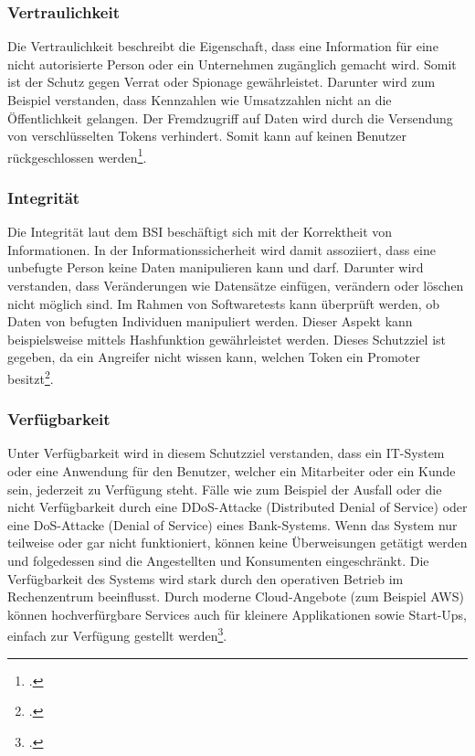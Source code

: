 \subsubsection{Vertraulichkeit}
Die Vertraulichkeit beschreibt die Eigenschaft, dass eine Information für eine nicht autorisierte Person oder ein Unternehmen zugänglich gemacht wird. Somit ist der Schutz gegen Verrat oder Spionage gewährleistet. Darunter wird zum Beispiel verstanden, dass Kennzahlen wie Umsatzzahlen nicht an die Öffentlichkeit gelangen. 
Der Fremdzugriff auf Daten wird durch die Versendung von verschlüsselten Tokens verhindert. Somit kann auf keinen Benutzer rückgeschlossen werden\footcite{Lehrunterlagen-HTL-cloud}.


\subsubsection{Integrität}
Die Integrität laut dem BSI beschäftigt sich mit der Korrektheit von Informationen. In der Informationssicherheit wird damit assoziiert, dass eine unbefugte Person keine Daten manipulieren kann und darf. Darunter wird verstanden, dass Veränderungen wie Datensätze einfügen, verändern oder löschen nicht möglich sind.
Im Rahmen von Softwaretests kann überprüft werden, ob Daten von befugten Individuen manipuliert werden. Dieser Aspekt kann beispielsweise mittels Hashfunktion gewährleistet werden.
Dieses Schutzziel ist gegeben, da ein Angreifer nicht wissen kann, welchen Token ein Promoter besitzt\footcite{Lehrunterlagen-HTL-cloud}.

\subsubsection{Verfügbarkeit}
Unter Verfügbarkeit wird in diesem Schutzziel verstanden, dass ein IT-System oder eine Anwendung für den Benutzer, welcher ein Mitarbeiter oder ein Kunde sein, jederzeit zu Verfügung steht. Fälle wie zum Beispiel der Ausfall oder die nicht Verfügbarkeit durch eine DDoS-Attacke (Distributed Denial of Service) oder eine DoS-Attacke (Denial of Service) eines Bank-Systems. Wenn das System nur teilweise oder gar nicht funktioniert, können keine Überweisungen getätigt werden und folgedessen sind die Angestellten und Konsumenten eingeschränkt. 
Die Verfügbarkeit des Systems wird stark durch den operativen Betrieb im Rechenzentrum beeinflusst. Durch moderne Cloud-Angebote (zum Beispiel AWS) können hochverfürgbare Services auch für kleinere Applikationen sowie Start-Ups, einfach zur Verfügung gestellt werden\footcite{Lehrunterlagen-HTL-cloud}.

